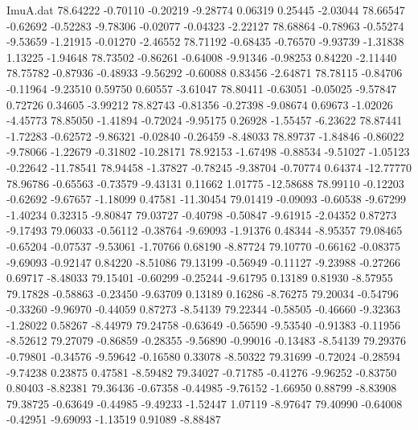 \begin{filecontents}{ImuA.dat}
  78.64222   -0.70110   -0.20219   -9.28774    0.06319    0.25445   -2.03044
  78.66547   -0.62692   -0.52283   -9.78306   -0.02077   -0.04323   -2.22127
  78.68864   -0.78963   -0.55274   -9.53659   -1.21915   -0.01270   -2.46552
  78.71192   -0.68435   -0.76570   -9.93739   -1.31838    1.13225   -1.94648
  78.73502   -0.86261   -0.64008   -9.91346   -0.98253    0.84220   -2.11440
  78.75782   -0.87936   -0.48933   -9.56292   -0.60088    0.83456   -2.64871
  78.78115   -0.84706   -0.11964   -9.23510    0.59750    0.60557   -3.61047
  78.80411   -0.63051   -0.05025   -9.57847    0.72726    0.34605   -3.99212
  78.82743   -0.81356   -0.27398   -9.08674    0.69673   -1.02026   -4.45773
  78.85050   -1.41894   -0.72024   -9.95175    0.26928   -1.55457   -6.23622
  78.87441   -1.72283   -0.62572   -9.86321   -0.02840   -0.26459   -8.48033
  78.89737   -1.84846   -0.86022   -9.78066   -1.22679   -0.31802  -10.28171
  78.92153   -1.67498   -0.88534   -9.51027   -1.05123   -0.22642  -11.78541
  78.94458   -1.37827   -0.78245   -9.38704   -0.70774    0.64374  -12.77770
  78.96786   -0.65563   -0.73579   -9.43131    0.11662    1.01775  -12.58688
  78.99110   -0.12203   -0.62692   -9.67657   -1.18099    0.47581  -11.30454
  79.01419   -0.09093   -0.60538   -9.67299   -1.40234    0.32315   -9.80847
  79.03727   -0.40798   -0.50847   -9.61915   -2.04352    0.87273   -9.17493
  79.06033   -0.56112   -0.38764   -9.69093   -1.91376    0.48344   -8.95357
  79.08465   -0.65204   -0.07537   -9.53061   -1.70766    0.68190   -8.87724
  79.10770   -0.66162   -0.08375   -9.69093   -0.92147    0.84220   -8.51086
  79.13199   -0.56949   -0.11127   -9.23988   -0.27266    0.69717   -8.48033
  79.15401   -0.60299   -0.25244   -9.61795    0.13189    0.81930   -8.57955
  79.17828   -0.58863   -0.23450   -9.63709    0.13189    0.16286   -8.76275
  79.20034   -0.54796   -0.33260   -9.96970   -0.44059    0.87273   -8.54139
  79.22344   -0.58505   -0.46660   -9.32363   -1.28022    0.58267   -8.44979
  79.24758   -0.63649   -0.56590   -9.53540   -0.91383   -0.11956   -8.52612
  79.27079   -0.86859   -0.28355   -9.56890   -0.99016   -0.13483   -8.54139
  79.29376   -0.79801   -0.34576   -9.59642   -0.16580    0.33078   -8.50322
  79.31699   -0.72024   -0.28594   -9.74238    0.23875    0.47581   -8.59482
  79.34027   -0.71785   -0.41276   -9.96252   -0.83750    0.80403   -8.82381
  79.36436   -0.67358   -0.44985   -9.76152   -1.66950    0.88799   -8.83908
  79.38725   -0.63649   -0.44985   -9.49233   -1.52447    1.07119   -8.97647
  79.40990   -0.64008   -0.42951   -9.69093   -1.13519    0.91089   -8.88487

\end{filecontents}
